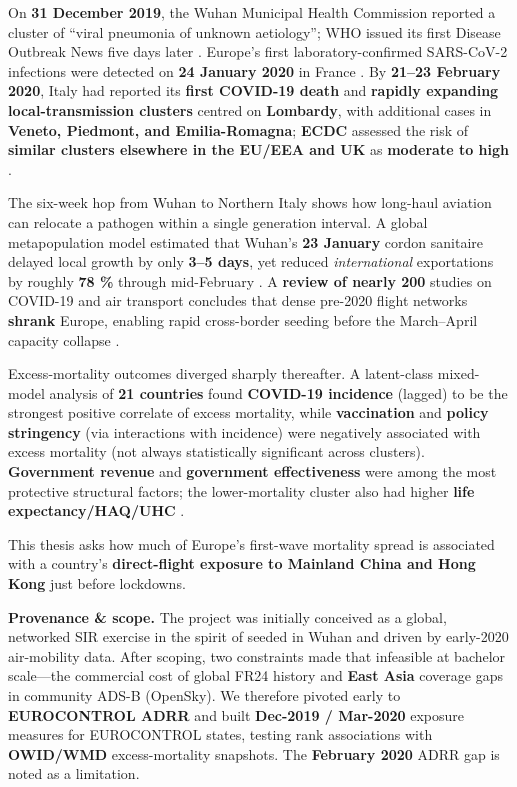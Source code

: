 \documentclass[
  authoryear,
  preprint,
  3p,
  onecolumn]{elsarticle}
\begin{document}
On \textbf{31 December 2019}, the Wuhan Municipal Health Commission
reported a cluster of ``viral pneumonia of unknown aetiology''; WHO
issued its first Disease Outbreak News five days later
\citep{who2022timeline}. Europe's first laboratory-confirmed SARS-CoV-2
infections were detected on \textbf{24 January 2020} in France
\citep{spiteri2020}. By \textbf{21--23 February 2020}, Italy had
reported its \textbf{first COVID-19 death} and \textbf{rapidly expanding
local-transmission clusters} centred on \textbf{Lombardy}, with
additional cases in \textbf{Veneto, Piedmont, and Emilia-Romagna};
\textbf{ECDC} assessed the risk of \textbf{similar clusters elsewhere in
the EU/EEA and UK} as \textbf{moderate to high} \citep{ecdcitaly2020}.

The six-week hop from Wuhan to Northern Italy shows how long-haul
aviation can relocate a pathogen within a single generation interval. A
global metapopulation model estimated that Wuhan's \textbf{23 January}
cordon sanitaire delayed local growth by only \textbf{3--5 days}, yet
reduced \emph{international} exportations by roughly \textbf{78 \%}
through mid-February \citep{chinazzi2020}. A \textbf{review of nearly
200} studies on COVID-19 and air transport concludes that dense pre-2020
flight networks \textbf{shrank} Europe, enabling rapid cross-border
seeding before the March--April capacity collapse \citep{sun2022_a}.

Excess-mortality outcomes diverged sharply thereafter. A latent-class
mixed-model analysis of \textbf{21 countries} found \textbf{COVID-19
incidence} (lagged) to be the strongest positive correlate of excess
mortality, while \textbf{vaccination} and \textbf{policy stringency}
(via interactions with incidence) were negatively associated with excess
mortality (not always statistically significant across clusters).
\textbf{Government revenue} and \textbf{government effectiveness} were
among the most protective structural factors; the lower-mortality
cluster also had higher \textbf{life expectancy/HAQ/UHC}
\citep{rahmanian2024}.

This thesis asks how much of Europe's first-wave mortality spread is
associated with a country's \textbf{direct-flight exposure to Mainland
China and Hong Kong} just before lockdowns.

\textbf{Provenance \& scope.} The project was initially conceived as a
global, networked SIR exercise in the spirit of \citet{brockmann2013}
seeded in Wuhan and driven by early-2020 air-mobility data. After
scoping, two constraints made that infeasible at bachelor scale---the
commercial cost of global FR24 history and \textbf{East Asia} coverage
gaps in community ADS-B (OpenSky). We therefore pivoted early to
\textbf{EUROCONTROL ADRR} and built \textbf{Dec-2019 / Mar-2020}
exposure measures for EUROCONTROL states, testing rank associations with
\textbf{OWID/WMD} excess-mortality snapshots. The \textbf{February 2020}
ADRR gap is noted as a limitation.
\end{document}
